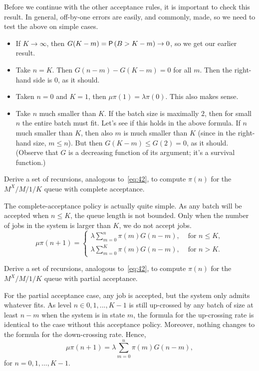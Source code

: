 \documentclass[companion]{subfiles}
\begin{document}
\begin{exercise}
\begin{solution}
 Before we continue with the other acceptance rules, it is important
 to check this result. In general, off-by-one errors are easily, and
 commonly, made, so we need to test the above on simple cases. 
 \begin{itemize}
 \item If $K\to \infty$, then $G(K-m)=\P{B>K-m}\to 0$, so we get our earlier result. 
 \item Take $n=K$. Then $G(n-m)-G(K-m)=0$ for all $m$. Then the right-hand side is 0, as it should.
 \item Taken $n=0$ and $K=1$, then $\mu \pi(1)= \lambda \pi(0)$. This also makes sense. 
 \item Take $n$ much smaller than $K$. If the batch size is maximally
 $2$, then for small $n$ the entire batch must fit. Let's see if
 this holds in the above formula. If $n$ much smaller than $K$,
 then also $m$ is much smaller than $K$ (since in the right-hand
 size, $m\leq n$). But then $G(K-m) \leq G(2) = 0$, as it
 should. (Observe that $G$ is a decreasing function of its argument;
 it's a survival function.)
 \end{itemize}
\end{solution}
\end{exercise}


\begin{extra}
 Derive a set of recursions, analogous to~\cref{eq:42}, to compute $\pi(n)$ for the $M^X/M/1/K$ queue with complete acceptance.
\begin{solution}
 The complete-acceptance policy is actually quite simple. As any
 batch will be accepted when $n\leq K$, the queue length is not
 bounded. Only when the number of jobs in the system is larger than
 $K$, we do not accept jobs. 
 \begin{equation*}
 \mu \pi(n+1) = 
 \begin{cases}
 \lambda \sum_{m=0}^n \pi(m) G(n-m), & \text{ for } n\leq K,\\
 \lambda \sum_{m=0}^K \pi(m) G(n-m), & \text{ for } n> K.
 \end{cases}
 \end{equation*}
\end{solution}
\end{extra}

\begin{extra}
 Derive a set of recursions, analogous to~\cref{eq:42}, to compute $\pi(n)$ for the $M^X/M/1/K$ queue with partial acceptance.
\begin{solution}
 For the partial acceptance case, any job is accepted, but the system only admits whatever fits.
 As level $n\in {0,1,...,K-1}$ is still up-crossed by any batch of size at least $n-m$ when the system is in state $m$, the formula for the up-crossing rate is identical to the case without this acceptance policy.
 Moreover, nothing changes to the formula for the down-crossing rate.
 Hence,
 \begin{equation*}
 \mu \pi(n+1) = \lambda \sum_{m=0}^n \pi(m) G(n-m), 
 \end{equation*}
 for $n=0,1,\ldots, K-1$. 
\end{solution}
\end{extra}
\end{document}
